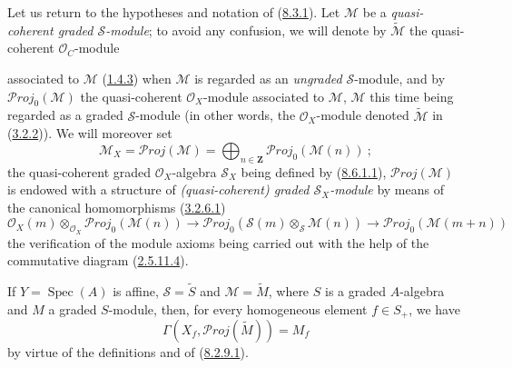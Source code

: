 \begin{env}[8.12.1]
\label{II.8.12.1}
Let us return to the hypotheses and notation of
(\hyperref[II.8.3.1]{8.3.1}). Let $\mathcal{M}$ be a \emph{quasi-coherent
graded $\mathcal{S}$-module}; to avoid any confusion, we will denote by
$\widetilde{\mathcal{M}}$ the quasi-coherent $\mathcal{O}_C$-module

associated to $\mathcal{M}$
(\hyperref[II.1.4.3]{1.4.3}) when $\mathcal{M}$ is regarded as an
\emph{ungraded} $\mathcal{S}$-module, and by
$\mathcal{P}\mathit{roj}_0(\mathcal{M})$ the quasi-coherent
$\mathcal{O}_X$-module associated to $\mathcal{M}$, $\mathcal{M}$ this time
being regarded as a graded $\mathcal{S}$-module (in other words, the
$\mathcal{O}_X$-module denoted $\widetilde{\mathcal{M}}$ in
(\hyperref[II.3.2.2]{3.2.2})). We will moreover set
\begin{equation}
\label{II.8.12.1.1}
  \mathcal{M}_X=\mathcal{P}\mathit{roj}(\mathcal{M})
  =\bigoplus_{n\in\mathbf{Z}}\mathcal{P}\mathit{roj}_0(\mathcal{M}(n))~;
\tag{8.12.1.1}
\end{equation}
the quasi-coherent graded $\mathcal{O}_X$-algebra $\mathcal{S}_X$ being
defined by (\hyperref[II.8.6.1.1]{8.6.1.1}),
$\mathcal{P}\mathit{roj}(\mathcal{M})$ is endowed with a structure of
\emph{(quasi-coherent) graded $\mathcal{S}_X$-module} by means of the canonical
homomorphisms (\hyperref[II.3.2.6.1]{3.2.6.1})
\begin{equation}
\label{II.8.12.1.2}
  \mathcal{O}_X(m)\otimes_{\mathcal{O}_X}
  \mathcal{P}\mathit{roj}_0(\mathcal{M}(n))
  \to \mathcal{P}\mathit{roj}_0(\mathcal{S}(m)\otimes_{\mathcal{S}}\mathcal{M}(n))
  \to \mathcal{P}\mathit{roj}_0(\mathcal{M}(m+n))
\tag{8.12.1.2}
\end{equation}
the verification of the module axioms being carried out with the help of the
commutative diagram (\hyperref[II.2.5.11.4]{2.5.11.4}).

If $Y=\operatorname{Spec}(A)$ is affine, $\mathcal{S}=\widetilde{S}$ and
$\mathcal{M}=\widetilde{M}$, where $S$ is a graded $A$-algebra and $M$ a
graded $S$-module, then, for every homogeneous element $f\in S_+$, we have
\begin{equation}
\label{II.8.12.1.3}
  \Gamma(X_f,\mathcal{P}\mathit{roj}(\widetilde{M}))=M_f
\tag{8.12.1.3}
\end{equation}
by virtue of the definitions and of (\hyperref[II.8.2.9.1]{8.2.9.1}).


\end{env}
